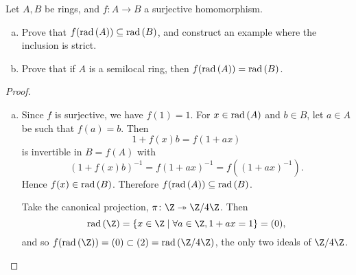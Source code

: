 \documentclass[10pt]{amsart}
\begin{document}
\begin{thm}
  Let $A,B$ be rings, and $f \colon A \rightarrow B$ a surjective homomorphism.
  \begin{enumerate}[(a)]
  \item
    Prove that $f(\operatorname{rad}{\left( A \right)}) \subseteq \operatorname{rad}{\left( B \right)}$, and construct an example where the inclusion is strict.
  \item
    Prove that if $A$ is a semilocal ring, then $f(\operatorname{rad}{\left( A \right)}) = \operatorname{rad}{\left( B \right)}$.
  \end{enumerate}

  \begin{proof}
    \begin{enumerate}[(a)]
    \item
      Since $f$ is surjective, we have $f(1) = 1$.
      For $x \in \operatorname{rad}{\left( A \right)}$ and $b \in B$, let $a \in A$ be such that $f(a) = b$.
      Then
      $$1 + f(x)b = f(1 + ax)$$
      is invertible in $B = f(A)$ with
      $$\left(1 + f(x)b\right)^{-1} = f(1 + ax)^{-1} = f\left( (1 + ax)^{-1}\right).$$
      Hence $f(x) \in \operatorname{rad}{\left( B \right)}$.
      Therefore $f(\operatorname{rad}{\left( A \right)}) \subseteq \operatorname{rad}{\left( B \right)}$.

      Take the canonical projection, $\pi \colon \Z \twoheadrightarrow \Z/4\Z$.
      Then
      $$\rad{\Z} = \left\{x \in \Z \;\middle\vert\; \forall a \in \Z, 1 + ax = 1\right\} = (0),$$
      and so $f(\rad{\Z}) = (0) \subset (2) = \rad{\Z/4\Z}$, the only two ideals of $\Z/4\Z$.
    \end{enumerate}
  \end{proof}
\end{thm}
\end{document}
